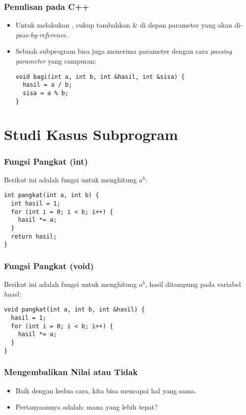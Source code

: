 \begin{frame}[fragile]
\frametitle{Penulisan pada C++}
\begin{itemize}
  \item Untuk melakukan , cukup tambahkan \& di depan parameter yang akan di-\textit{pass-by-reference}.
  \item Sebuah subprogram bisa juga menerima parameter dengan cara \textit{passing parameter} yang campuran:
\begin{lstlisting}
void bagi(int a, int b, int &hasil, int &sisa) {
  hasil = a / b;
  sisa = a % b;
}
\end{lstlisting}
\end{itemize}
\end{frame}

\section{Studi Kasus Subprogram}
\frame{\sectionpage}

\begin{frame}[fragile]
\frametitle{Fungsi Pangkat (int)}
Berikut ini adalah fungsi untuk menghitung $a^b$:
\begin{lstlisting}
int pangkat(int a, int b) {
  int hasil = 1;
  for (int i = 0; i < b; i++) {
    hasil *= a;
  }
  return hasil;
}
\end{lstlisting}
\end{frame}

\begin{frame}[fragile]
\frametitle{Fungsi Pangkat (void)}
Berikut ini adalah fungsi untuk menghitung $a^b$, hasil ditampung pada variabel $hasil$:
\begin{lstlisting}
void pangkat(int a, int b, int &hasil) {
  hasil = 1;
  for (int i = 0; i < b; i++) {
    hasil *= a;
  }
}
\end{lstlisting}
\end{frame}

\begin{frame}[fragile]
\frametitle{Mengembalikan Nilai atau Tidak}
\begin{itemize}
  \item Baik dengan kedua cara, kita bisa mencapai hal yang sama.
  \item Pertanyaannya adalah: \alert{mana yang lebih tepat}?
\end{itemize}
\end{frame}

